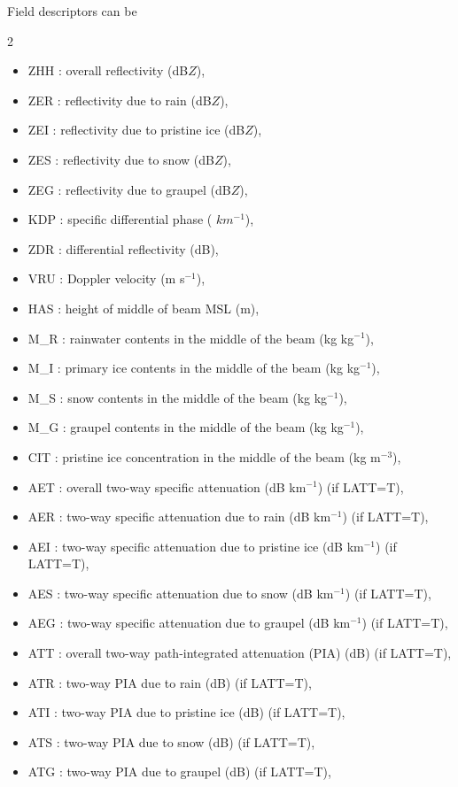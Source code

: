 Field descriptors can be
\begin{multicols}2
\begin{itemize}
\item ZHH : overall reflectivity (dB$Z$),
\item ZER : reflectivity due to rain (dB$Z$),
\item ZEI : reflectivity due to pristine ice (dB$Z$),
\item ZES : reflectivity due to snow (dB$Z$),
\item ZEG : reflectivity due to graupel (dB$Z$),
\item KDP : specific differential phase ( $ km^{-1}$),
\item ZDR : differential reflectivity (dB),
\item VRU : Doppler velocity (m s$^{-1}$),
\item HAS : height of middle of beam MSL (m),
\item M\_R : rainwater contents in the middle of the beam (kg kg$^{-1}$),
\item M\_I : primary ice contents in the middle of the beam (kg kg$^{-1}$),
\item M\_S : snow contents in the middle of the beam (kg kg$^{-1}$),
\item M\_G : graupel contents in the middle of the beam (kg kg$^{-1}$),
\item CIT : pristine ice concentration in the middle of the beam (kg m$^{-3}$),
\item AET : overall two-way specific attenuation (dB km$^{-1}$) (if LATT=T),
\item AER : two-way specific attenuation due to rain (dB km$^{-1}$) (if LATT=T),
\item AEI : two-way specific attenuation due to pristine ice (dB km$^{-1}$) (if LATT=T),
\item AES : two-way specific attenuation due to snow (dB km$^{-1}$) (if LATT=T),
\item AEG : two-way specific attenuation due to graupel (dB km$^{-1}$) (if LATT=T),
\item ATT : overall two-way path-integrated attenuation (PIA) (dB) (if LATT=T),
\item ATR : two-way PIA due to rain (dB) (if LATT=T),
\item ATI : two-way PIA due to pristine ice (dB) (if LATT=T),
\item ATS : two-way PIA due to snow (dB) (if LATT=T),
\item ATG : two-way PIA due to graupel (dB) (if LATT=T),

\end{itemize}
\end{multicols}
